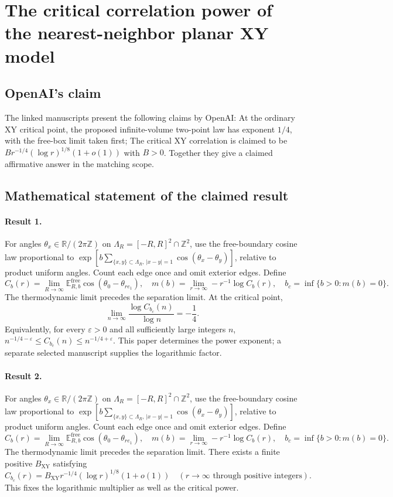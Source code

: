 \documentclass[11pt]{article}
\begin{document}
\section*{The critical correlation power of the nearest-neighbor planar XY model}

\subsection{OpenAI's claim}
The linked manuscripts present the following claims by OpenAI: At the ordinary XY critical point, the proposed infinite-volume two-point law has exponent $1/4$, with the free-box limit taken first; The critical XY correlation is claimed to be $B r^{-1/4}(\log r)^{1/8}(1+o(1))$ with $B>0$. Together they give a claimed affirmative answer in the matching scope.

\subsection{Mathematical statement of the claimed result}
\paragraph{Result 1.} For angles $\theta_x\in\mathbb R/(2\pi\mathbb Z)$ on $\Lambda_R=[-R,R]^2\cap\mathbb Z^2$, use the free-boundary cosine law proportional to $\exp[b\sum_{\{x,y\}\subset\Lambda_R,\,|x-y|=1}\cos(\theta_x-\theta_y)]$, relative to product uniform angles. Count each edge once and omit exterior edges. Define
\[
 C_b(r)=\lim_{R\to\infty}\mathbb E_{R,b}^{\mathrm{free}}\cos(\theta_0-\theta_{re_1}),\quad
 m(b)=\lim_{r\to\infty}-r^{-1}\log C_b(r),\quad b_c=\inf\{b>0:m(b)=0\}.
\]
The thermodynamic limit precedes the separation limit. At the critical point,
\[
 \lim_{n\to\infty}\frac{\log C_{b_c}(n)}{\log n}=-\frac14.
\]
Equivalently, for every $\varepsilon>0$ and all sufficiently large integers $n$, $n^{-1/4-\varepsilon}\le C_{b_c}(n)\le n^{-1/4+\varepsilon}$. This paper determines the power exponent; a separate selected manuscript supplies the logarithmic factor.

\paragraph{Result 2.} For angles $\theta_x\in\mathbb R/(2\pi\mathbb Z)$ on $\Lambda_R=[-R,R]^2\cap\mathbb Z^2$, use the free-boundary cosine law proportional to $\exp[b\sum_{\{x,y\}\subset\Lambda_R,\,|x-y|=1}\cos(\theta_x-\theta_y)]$, relative to product uniform angles. Count each edge once and omit exterior edges. Define
\[
 C_b(r)=\lim_{R\to\infty}\mathbb E_{R,b}^{\mathrm{free}}\cos(\theta_0-\theta_{re_1}),\quad
 m(b)=\lim_{r\to\infty}-r^{-1}\log C_b(r),\quad b_c=\inf\{b>0:m(b)=0\}.
\]
The thermodynamic limit precedes the separation limit. There exists a finite positive $B_{\mathrm{XY}}$ satisfying
\[
 C_{b_c}(r)=B_{\mathrm{XY}}r^{-1/4}(\log r)^{1/8}(1+o(1))\quad(r\to\infty\text{ through positive integers}).
\]
This fixes the logarithmic multiplier as well as the critical power.
\end{document}
